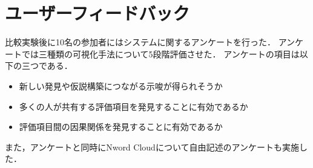 \documentclass[syuuron]{kuee}
\begin{document}
	\section{ユーザーフィードバック}
		比較実験後に10名の参加者にはシステムに関するアンケートを行った．
		アンケートでは三種類の可視化手法について5段階評価させた．
		アンケートの項目は以下の三つである．
		
		\begin{itemize}
			\item 新しい発見や仮説構築につながる示唆が得られそうか
			\item 多くの人が共有する評価項目を発見することに有効であるか
			\item 評価項目間の因果関係を発見することに有効であるか
		\end{itemize}
		また，アンケートと同時にNword Cloudについて自由記述のアンケートも実施した．
		
\end{document}
